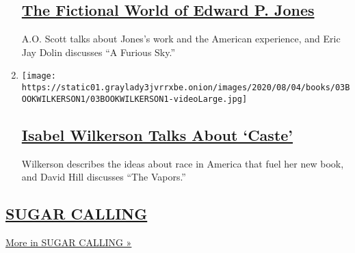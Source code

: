 \begin{enumerate}
  \hypertarget{the-fictional-world-of-edward-p-jones}{%
  \subsection{\texorpdfstring{\href{/2020/08/14/books/review/podcast-a-o-scott-edward-p-jones-eric-jay-dolin-furious-sky-hurricanes.html}{The
  Fictional World of Edward P.
  Jones}}{The Fictional World of Edward P. Jones}}\label{the-fictional-world-of-edward-p-jones}}

  A.O. Scott talks about Jones's work and the American experience, and
  Eric Jay Dolin discusses ``A Furious Sky.''
\item
  \texttt{[image: https://static01.graylady3jvrrxbe.onion/images/2020/08/04/books/03BOOKWILKERSON1/03BOOKWILKERSON1-videoLarge.jpg]}

  \hypertarget{isabel-wilkerson-talks-about-caste}{%
  \subsection{\texorpdfstring{\href{/2020/08/07/books/review/podcast-isabel-wilkerson-caste-david-hill-vapors.html}{Isabel
  Wilkerson Talks About
  `Caste'}}{Isabel Wilkerson Talks About `Caste'}}\label{isabel-wilkerson-talks-about-caste}}

  Wilkerson describes the ideas about race in America that fuel her new
  book, and David Hill discusses ``The Vapors.''
\end{enumerate}

\hypertarget{sugar-calling}{%
\subsection{\texorpdfstring{\href{/column/sugar-calling}{SUGAR
CALLING}}{SUGAR CALLING}}\label{sugar-calling}}

\href{/column/sugar-calling}{More in SUGAR CALLING »}

